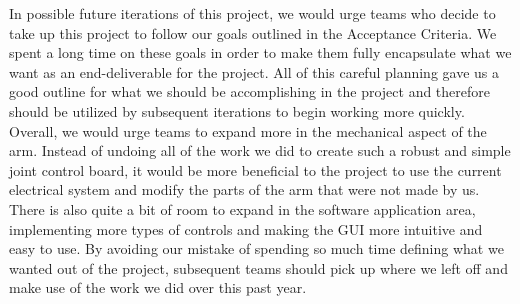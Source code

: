 \noindent In possible future iterations of this project, we would urge teams who decide to take up this project to follow our goals outlined in the Acceptance Criteria. We spent a long time on these goals in order to make them fully encapsulate what we want as an end-deliverable for the project.  All of this careful planning gave us a good outline for what we should be accomplishing in the project and therefore should be utilized by subsequent iterations to begin working more quickly. Overall, we would urge teams to expand more in the mechanical aspect of the arm. Instead of undoing all of the work we did to create such a robust and simple joint control board, it would be more beneficial to the project to use the current electrical system and modify the parts of the arm that were not made by us. There is also quite a bit of room to expand in the software application area, implementing more types of controls and making the GUI more intuitive and easy to use. By avoiding our mistake of spending so much time defining what we wanted out of the project, subsequent teams should pick up where we left off and make use of the work we did over this past year. \\


